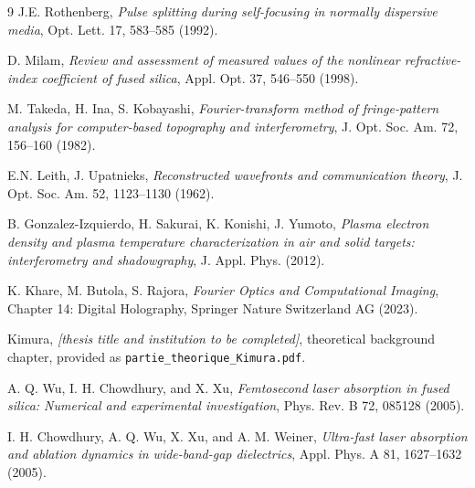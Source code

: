 \begin{thebibliography}{9}
J.E. Rothenberg,
\textit{Pulse splitting during self-focusing in normally dispersive media},
Opt. Lett. 17, 583--585 (1992).

D. Milam,
\textit{Review and assessment of measured values of the nonlinear refractive-index coefficient of fused silica},
Appl. Opt. 37, 546--550 (1998).

M. Takeda, H. Ina, S. Kobayashi,
\textit{Fourier-transform method of fringe-pattern analysis for computer-based topography and interferometry},
J. Opt. Soc. Am. 72, 156--160 (1982).

E.N. Leith, J. Upatnieks,
\textit{Reconstructed wavefronts and communication theory},
J. Opt. Soc. Am. 52, 1123--1130 (1962).

B. Gonzalez-Izquierdo, H. Sakurai, K. Konishi, J. Yumoto,
\textit{Plasma electron density and plasma temperature characterization in air and solid targets: interferometry and shadowgraphy},
J. Appl. Phys. (2012).

K. Khare, M. Butola, S. Rajora,
\textit{Fourier Optics and Computational Imaging}, Chapter 14: Digital Holography,
Springer Nature Switzerland AG (2023).

Kimura,
\textit{[thesis title and institution to be completed]},
theoretical background chapter, provided as \texttt{partie\_theorique\_Kimura.pdf}.


A. Q. Wu, I. H. Chowdhury, and X. Xu,
\textit{Femtosecond laser absorption in fused silica: Numerical and experimental investigation},
Phys. Rev. B 72, 085128 (2005).

I. H. Chowdhury, A. Q. Wu, X. Xu, and A. M. Weiner,
\textit{Ultra-fast laser absorption and ablation dynamics in wide-band-gap dielectrics},
Appl. Phys. A 81, 1627--1632 (2005).

\end{thebibliography}
